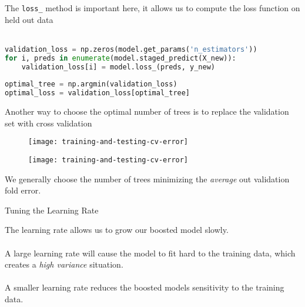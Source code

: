%
\begin{frame}[fragile]
The \texttt{loss\_} method is important here, it allows us to compute the loss function on held out data\\~\\

\begin{lstlisting}[language=python]
validation_loss = np.zeros(model.get_params('n_estimators'))
for i, preds in enumerate(model.staged_predict(X_new)):
    validation_loss[i] = model.loss_(preds, y_new)
    
optimal_tree = np.argmin(validation_loss)
optimal_loss = validation_loss[optimal_tree]
\end{lstlisting}

\end{frame}
%
\begin{frame}
Another way to choose the optimal number of trees is to replace the validation set with cross validation

  \begin{figure}
    \texttt{[image: training-and-testing-cv-error]}
  \end{figure}
  
\end{frame}
%
\begin{frame}

  \begin{figure}
    \texttt{[image: training-and-testing-cv-error]}
  \end{figure}
  
We generally choose the number of trees minimizing the \textit{average} out validation fold error.

\end{frame}
%
\begin{frame}{Tuning the Learning Rate}

The learning rate allows us to grow our boosted model slowly.\\~\\

A large learning rate will cause the model to fit hard to the training data, which creates a \textit{high variance} situation.\\~\\

A smaller learning rate reduces the boosted models sensitivity to the training data.\\~\\

\end{frame}
